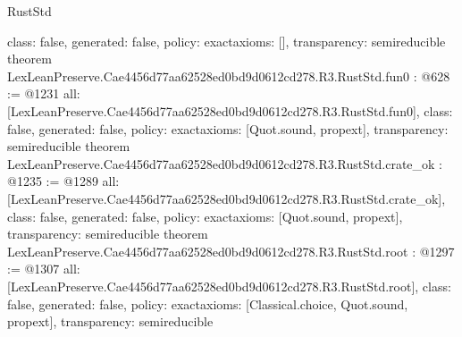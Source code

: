 \begin{lexlean}{RustStd}
\begin{coremodule}
{  class: false,
  generated: false,
  policy: exact{axioms: []},
  transparency: semireducible
}
theorem LexLeanPreserve.Cae4456d77aa62528ed0bd9d0612cd278.R3.RustStd.fun0 : @628 := @1231 {
  all: [LexLeanPreserve.Cae4456d77aa62528ed0bd9d0612cd278.R3.RustStd.fun0],
  class: false,
  generated: false,
  policy: exact{axioms: [Quot.sound, propext]},
  transparency: semireducible
}
theorem LexLeanPreserve.Cae4456d77aa62528ed0bd9d0612cd278.R3.RustStd.crate_ok : @1235 := @1289 {
  all: [LexLeanPreserve.Cae4456d77aa62528ed0bd9d0612cd278.R3.RustStd.crate_ok],
  class: false,
  generated: false,
  policy: exact{axioms: [Quot.sound, propext]},
  transparency: semireducible
}
theorem LexLeanPreserve.Cae4456d77aa62528ed0bd9d0612cd278.R3.RustStd.root : @1297 := @1307 {
  all: [LexLeanPreserve.Cae4456d77aa62528ed0bd9d0612cd278.R3.RustStd.root],
  class: false,
  generated: false,
  policy: exact{axioms: [Classical.choice, Quot.sound, propext]},
  transparency: semireducible
}


\end{coremodule}
\end{lexlean}
